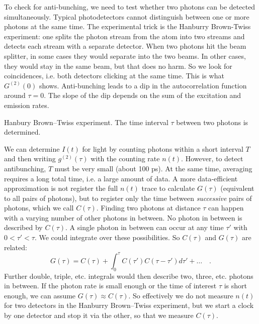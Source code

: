 To check for anti-bunching, we need to test whether two photons can be detected simultaneously. Typical photodetectors cannot distinguish between one or more photons at the same time. The experimental trick is the Hanburry Brown-Twiss experiment: one splits the photon stream from the atom into two streams and detects each stream with a separate detector. When two photons hit the beam splitter, in some cases they would separate into the two beams. In other cases, they would stay in the same beam, but that does no harm. So we look for coincidences, i.e. both detectors clicking at the same time. This is what $G^{(2)}(0)$ shows. Anti-bunching leads to a dip in the autocorrelation function around $\tau = 0$. The slope of the dip depends on the sum of the excitation and emission rates. 

\begin{marginfigure}
    \caption{Hanbury Brown--Twiss experiment. The time interval $\tau$ between two photons is determined. \label{fig:8_HBT}}
\end{marginfigure}

We can determine $I(t)$ for light by counting photons within a short interval $T$ and then writing $g^{(2)}(\tau)$ with the counting rate $n(t)$. However, to detect antibunching, $T$ must be very small (about 100 ps). At the same time, averaging requires a long total time, i.e. a large amount of data. 
A more data-efficient approximation is not register the full $n(t)$ trace to calculate $G(\tau)$ (equivalent to all pairs of photons), but to register only the time between  \emph{successive} pairs of photons, which we call $C(\tau)$. 
Finding two photons at distance $\tau$ can happen with a varying number of other photons in between. No photon in between is described by $C(\tau)$. A single photon in between can occur at any time $\tau'$ with $0 < \tau' < \tau$. 
We could integrate over these possibilities. So $C(\tau)$ and $G(\tau)$ are related:
\begin{equation}
    G(\tau) = C(\tau) + \int_0^\tau C(\tau') C(\tau-\tau') d\tau' + \dots \quad .
\end{equation}
Further double, triple, etc. integrals would then describe two, three, etc. photons in between. If the photon rate is small enough or the time of interest $\tau$ is short enough, we can assume $G(\tau) \approx C(\tau)$. So effectively we do not measure $n(t)$ for two detectors in the Hanburry Brown--Twiss experiment, but we start a clock by one detector and stop it via the other, so that we measure $C(\tau)$.

